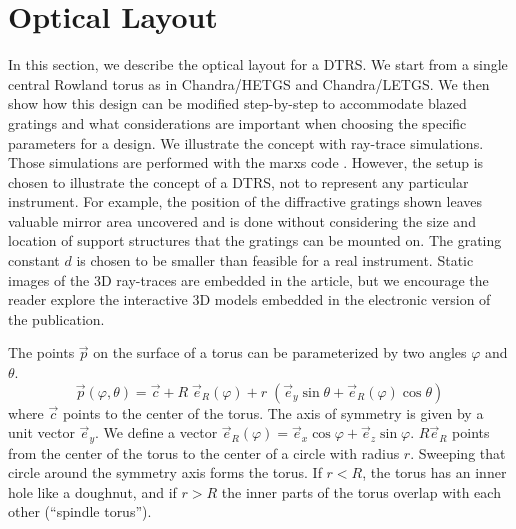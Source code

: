 \documentclass[linenumbers]{aastex631}
\begin{document}
\section{Optical Layout}
\label{sect:opticallayout}
In this section, we describe the optical layout for a DTRS. We start from a single central Rowland torus as in Chandra/HETGS and Chandra/LETGS. We then show how this design can be modified step-by-step to accommodate blazed gratings and what considerations are important when choosing the specific parameters for a design. We illustrate the concept with ray-trace simulations. Those simulations are performed with the marxs code \citep{2017AJ....154..243G}. However, the setup is chosen to illustrate the concept of a DTRS, not to represent any particular instrument. For example, the position of the diffractive gratings shown leaves valuable mirror area uncovered and is done without considering the size and location of support structures that the gratings can be mounted on. The grating constant $d$ is chosen to be smaller than feasible for a real instrument. Static images of the 3D ray-traces are embedded in the article, but we encourage the reader explore the interactive 3D models embedded in the electronic version of the publication.

The points $\vec p$ on the surface of a torus can be parameterized by two angles $\varphi$ and $\theta$.
\begin{equation}
\vec p(\varphi, \theta) = \vec c + R \; \vec e_R(\varphi) + r \; (\vec e_y \sin \theta + \vec e_R(\varphi) \cos \theta)
\end{equation}
where $\vec c$ points to the center of the torus. The axis of symmetry is given by a unit vector $\vec e_y$. We define a vector $\vec e_R(\varphi) = \vec e_x \cos\varphi + \vec e_z \sin\varphi$. $R \vec e_R$ points from the center of the torus to the center of a circle with radius $r$. Sweeping that circle around the symmetry axis forms the torus. If $r < R$, the torus has an inner hole like a doughnut, and if $r > R$ the inner parts of the torus overlap with each other (``spindle torus'').
\end{document}
